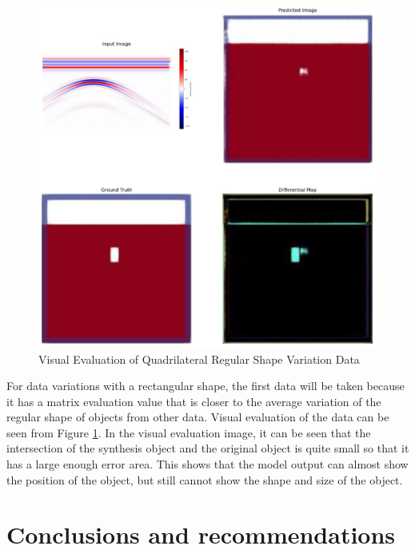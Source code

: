 \documentclass[conference]{IEEEtran}
\begin{document}
\begin{figure}[ht]
  \centering
  \includegraphics[scale=0.15]{gambar/diffMapSegi4.jpg}
  \caption{Visual Evaluation of Quadrilateral Regular Shape Variation Data}
  \label{fig:diffmapsegi4}
\end{figure}

For data variations with a rectangular shape, the first data will be taken because it has a matrix evaluation value that is closer to the average variation of the regular shape of objects from other data.
Visual evaluation of the data can be seen from Figure \ref{fig:diffmapsegi4}.
In the visual evaluation image, it can be seen that the intersection of the synthesis object and the original object is quite small so that it has a large enough error area.
This shows that the model output can almost show the position of the object, but still cannot show the shape and size of the object.

\section{Conclusions and recommendations}
 
\end{document}
